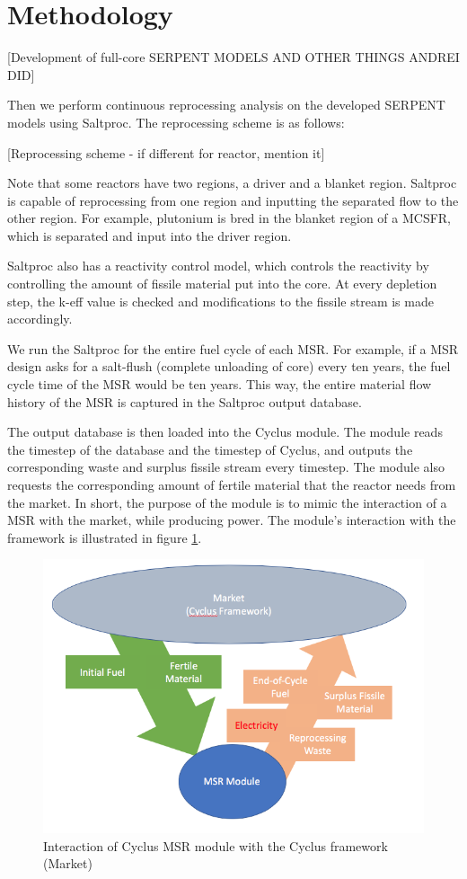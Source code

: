 \section{Methodology}

[Development of full-core SERPENT MODELS AND OTHER THINGS ANDREI DID]

Then we perform continuous reprocessing analysis on the developed
SERPENT models using Saltproc. The reprocessing scheme is as follows:

[Reprocessing scheme - if different for reactor, mention it]

Note that some reactors have two regions, a driver and a blanket region.
Saltproc is capable of reprocessing from one region and inputting
the separated flow to the other region. For example, plutonium is bred
in the blanket region of a MCSFR, which is separated and input into
the driver region. 

Saltproc also has a reactivity control model, which controls the reactivity
by controlling the amount of fissile material put into the core. At
every depletion step, the k-eff value is checked and modifications
to the fissile stream is made accordingly.


We run the Saltproc for the entire fuel cycle of each \gls{MSR}. For example,
if a \gls{MSR} design asks for a salt-flush (complete unloading of core)
every ten years, the fuel cycle time of the \gls{MSR} would be ten years.
This way, the entire material flow history of the \gls{MSR} is captured
in the Saltproc output database.

The output database is then loaded into the Cyclus module.
The module reads the timestep of the database and the timestep of Cyclus,
and outputs the corresponding waste and surplus fissile stream every timestep.
The module also requests the corresponding amount of fertile material
that the reactor needs from the market. In short, the purpose of the module is to
mimic the interaction of a \gls{MSR} with the market, while producing
power. The module's interaction with the framework is illustrated in
figure \ref{fig:msr_int}.


\begin{figure}[htbp!]
    \begin{center}
        \includegraphics[scale=0.5]{./images/msr_flowchart.png}
    \end{center}
        \caption{Interaction of Cyclus \gls{MSR} module with the Cyclus framework (Market)}
    \label{fig:msr_int}
\end{figure}
